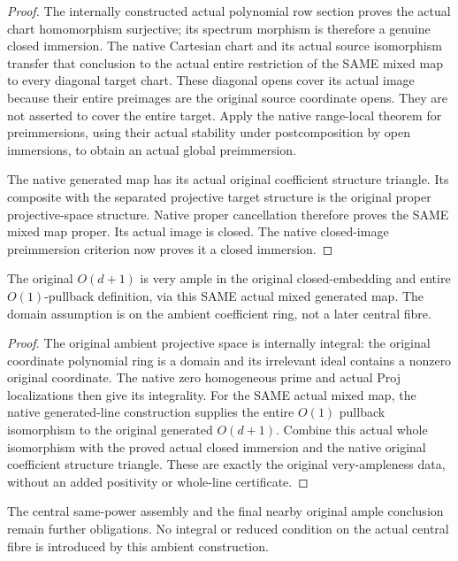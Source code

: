 \begin{proof}
The internally constructed actual polynomial row section proves the actual
chart homomorphism surjective; its spectrum morphism is therefore a genuine
closed immersion. The native Cartesian chart and its actual source isomorphism
transfer that conclusion to the actual entire restriction of the SAME mixed
map to every diagonal target chart. These diagonal opens cover its actual
image because their entire preimages are the original source coordinate
opens. They are not asserted to cover the entire target. Apply the native
range-local theorem for preimmersions, using their actual stability under
postcomposition by open immersions, to obtain an actual global preimmersion.

The native generated map has its actual original coefficient structure
triangle. Its composite with the separated projective target structure is
the original proper projective-space structure. Native proper cancellation
therefore proves the SAME mixed map proper. Its actual image is closed.
The native closed-image preimmersion criterion now proves it a closed immersion.
\end{proof}
\begin{theorem}
\label{thm:central-embedding-original-mixed-positive-twist-very-ample}
\leanok
The original $O(d+1)$ is very ample in the original closed-embedding and entire
$O(1)$-pullback definition, via this SAME actual mixed generated map.
The domain assumption is on the ambient coefficient ring, not a later central fibre.
\end{theorem}
\begin{proof}
The original ambient projective space is internally integral: the original
coordinate polynomial ring is a domain and its irrelevant ideal contains a
nonzero original coordinate. The native zero homogeneous prime and actual
Proj localizations then give its integrality. For the SAME actual mixed map,
the native generated-line construction supplies the entire $O(1)$ pullback
isomorphism to the original generated $O(d+1)$. Combine this actual whole
isomorphism with the proved actual closed immersion and the native original
coefficient structure triangle. These are exactly the original very-ampleness
data, without an added positivity or whole-line certificate.
\end{proof}
The central same-power assembly and the final nearby original ample conclusion
remain further obligations. No integral or reduced condition on the actual
central fibre is introduced by this ambient construction.
